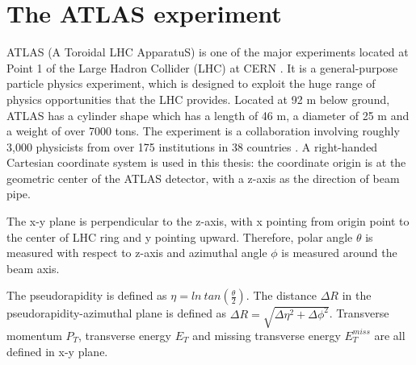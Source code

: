 \chapter{The ATLAS experiment}

\label{ch:atlas}
\par ATLAS (A Toroidal LHC ApparatuS) is one of the major experiments located at Point 1 of the Large Hadron Collider (LHC) at CERN \cite{Aad:2008zzm}. 
It is a general-purpose particle physics experiment, which is designed to exploit the huge range of physics opportunities that the LHC provides. 
		Located at 92 m below ground, ATLAS has a cylinder shape which has a length of 46 m, a diameter of 25 m and a weight of over 7000 tons.
 The experiment is a collaboration involving roughly 3,000 physicists from over 175 institutions in 38 countries \cite{fact}.
A right-handed Cartesian coordinate system is used in this thesis: the coordinate origin is at the geometric center of the ATLAS detector, with a z-axis as 
the direction of beam pipe.
\par The x-y plane is perpendicular to the z-axis, with x pointing from origin point to the center 
of LHC ring and y pointing upward. Therefore, polar angle $\theta$ is measured with respect to z-axis and azimuthal angle $\phi$ is measured around the beam axis. 
\par The pseudorapidity is defined as $\eta = ln~tan(\frac{\theta}{2})$. The distance $\Delta R$ in the pseudorapidity-azimuthal plane is defined as 
$\Delta R = \sqrt{\Delta\eta^2 + \Delta\phi^2}$. Transverse momentum $P_T$, transverse energy $E_T$ and missing transverse energy $E_T^{miss}$ are all defined in x-y plane.				

